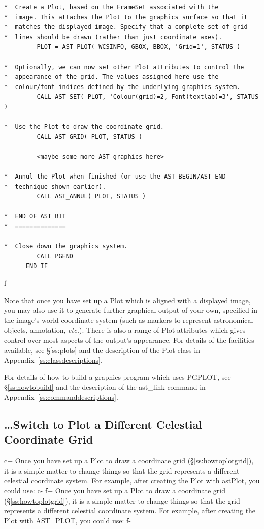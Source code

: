 \documentclass[twoside,11pt]{article}
\newcommand{\appref}[1]{Appendix~\ref{#1}}
\newcommand{\secref}[1]{\S\ref{#1}}
\newcommand{\appref}[1]{\ref{#1}}
\newcommand{\secref}[1]{\ref{#1}}
\begin{document}
\begin{verbatim}
*  Create a Plot, based on the FrameSet associated with the
*  image. This attaches the Plot to the graphics surface so that it
*  matches the displayed image. Specify that a complete set of grid
*  lines should be drawn (rather than just coordinate axes).
         PLOT = AST_PLOT( WCSINFO, GBOX, BBOX, 'Grid=1', STATUS )

*  Optionally, we can now set other Plot attributes to control the
*  appearance of the grid. The values assigned here use the
*  colour/font indices defined by the underlying graphics system.
         CALL AST_SET( PLOT, 'Colour(grid)=2, Font(textlab)=3', STATUS )

*  Use the Plot to draw the coordinate grid.
         CALL AST_GRID( PLOT, STATUS )

         <maybe some more AST graphics here>

*  Annul the Plot when finished (or use the AST_BEGIN/AST_END
*  technique shown earlier).
         CALL AST_ANNUL( PLOT, STATUS )

*  END OF AST BIT
*  ==============

*  Close down the graphics system.
         CALL PGEND
      END IF
\end{verbatim}
\normalsize
f-

Note that once you have set up a Plot which is aligned with a
displayed image, you may also use it to generate further graphical
output of your own, specified in the image's world coordinate system
(such as markers to represent astronomical objects, annotation,
{\em{etc.}}). There is also a range of Plot attributes which gives
control over most aspects of the output's appearance.  For details of
the facilities available, see \secref{ss:plots} and the description of
the Plot class in \appref{ss:classdescriptions}.

For details of how to build a graphics program which uses PGPLOT, see
\secref{ss:howtobuild} and the description of the ast\_link command in
\appref{ss:commanddescriptions}.

\subsection{\label{ss:howtoswitchgrid}\ldots Switch to Plot a Different Celestial Coordinate Grid}

c+
Once you have set up a Plot to draw a coordinate grid
(\secref{ss:howtoplotgrid}), it is a simple matter to change things so
that the grid represents a different celestial coordinate system. For
example, after creating the Plot with astPlot, you could use:
c-
f+
Once you have set up a Plot to draw a coordinate grid
(\secref{ss:howtoplotgrid}), it is a simple matter to change things so
that the grid represents a different celestial coordinate system. For
example, after creating the Plot with AST\_PLOT, you could use:
f-
\end{document}
